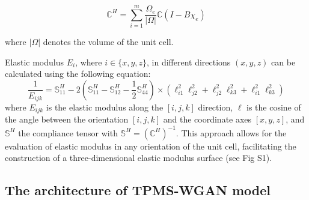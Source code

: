 \documentclass[preprint,review,12pt,authoryear]{elsarticle}
\begin{document}
\begin{equation}
    \mathbb{C}^H = \sum_{i=1}^m\frac{\Omega_e}{|\Omega|}\mathbb{C}(I-B\chi_e)
\end{equation}

where $|\Omega|$ denotes the volume of the unit cell.

Elastic modulus $E_i$, where $i \in \{x, y, z\}$, in different directions $(x,y,z)$  can be calculated using the following equation:
\begin{equation}
\frac{1}{E_{ijk}} = \mathbb{S}^H_{11} - 2 \left(\mathbb{S}^H_{11} - \mathbb{S}^H_{12} - \frac{1}{2} \mathbb{S}^H_{44} \right) \times \left( \ell_{i1}^2 \ell_{j2}^2 + \ell_{j2}^2 \ell_{k3}^2 + \ell_{i1}^2 \ell_{k3}^2 \right)
    \label{eq:6}
\end{equation}
where $E_{ijk}$ is the elastic modulus along the $[i,j,k]$ direction, $\ell$ is the cosine of the angle between the orientation $[i,j,k]$ and the coordinate axes $[x, y, z]$, and $\mathbb{S}^H$ the compliance tensor with $\mathbb{S}^H = (\mathbb{C}^H)^{-1}$. This approach allows for the evaluation of elastic modulus in any orientation of the unit cell, facilitating the construction of a three-dimensional elastic modulus surface (see Fig S1).

\subsection{The architecture of TPMS-WGAN model}
\end{document}
